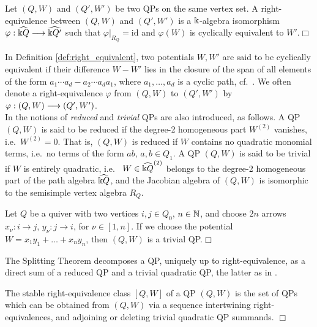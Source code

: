 \begin{definition}\label{def:right_equivalent}
Let $(Q,W)$ and $(Q',W')$ be two QPs on the same vertex set. A right-equivalence between $(Q,W)$ and $(Q',W')$ is a $\Bbbk$-algebra isomorphism $\varphi:\widehat{\Bbbk Q}\longrightarrow\widehat{\Bbbk Q'}$ such that $\varphi|_{R_Q}=\mbox{id}$ and $\varphi(W)$ is cyclically equivalent to $W'$.\hfill$\Box$
\end{definition}

\noindent In Definition \ref{def:right_equivalent}, two potentials $W,W'$ are said to be cyclically equivalent if their difference $W-W'$ lies in the closure of the span of all elements of the form $a_1\cdots a_d-a_2\cdots a_da_1$, where $a_1,\ldots,a_d$ is a cyclic path, cf.~\cite[Definition 3.2]{DWZ}. We often denote a right-equivalence $\varphi$ from $(Q,W)$ to $(Q',W')$ by $\varphi:(Q,W)\longrightarrow(Q',W')$.\\

In \cite{DWZ} the notions of {\it reduced} and {\it trivial} QPs are also introduced, as follows. A QP $(Q,W)$ is said to be reduced if the degree-2 homogeneous part $W^{(2)}$ vanishes, i.e.~$W^{(2)}=0$. That is, $(Q,W)$ is reduced if $W$ contains no quadratic monomial terms, i.e.~no terms of the form $ab$, $a,b\in Q_1$. A QP $(Q,W)$ is said to be trivial if $W$ is entirely quadratic, i.e.~ $W\in \widehat{\Bbbk Q}^{(2)}$ belongs to the degree-2 homogeneous part of the path algebra $\widehat{\Bbbk Q}$, and the Jacobian algebra of $(Q,W)$ is isomorphic to the semisimple vertex algebra $R_Q$.

\begin{example}\label{ex:trivialQP} Let $Q$ be a quiver with two vertices $i,j\in Q_0$, $n\in\mathbb N$, and choose $2n$ arrows $x_\nu:i\to j$, $y_\nu:j\to i$, for $\nu\in[1,n]$. If we choose the potential $W=x_1y_1+\ldots+x_ny_n$, then $(Q,W)$ is a trivial QP.\hfill$\Box$
\end{example}

\noindent The Splitting Theorem \cite[Theorem~4.6]{DWZ} decomposes a QP, uniquely up to right-equivalence, as a direct sum of a reduced QP and a trivial quadratic QP, the latter as in .

\begin{definition}\label{def:stable-class}
The stable right-equivalence class $[Q,W]$ of a QP \((Q,W)\) is the set of QPs which can be obtained from $(Q,W)$ via a sequence intertwining right-equivalences, and adjoining or deleting trivial quadratic QP summands.
\hfill$\Box$\end{definition}

